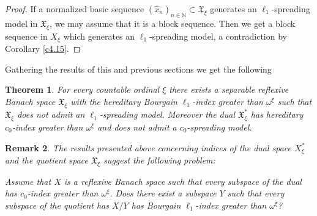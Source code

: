 \documentclass[a4paper]{amsart}
\theoremstyle{plain}
\newtheorem{theorem}{Theorem}[section]
\newtheorem{remark}[theorem]{Remark}
\newcommand{\N}{\mathbb{N}}
\newcommand{\hxn}[1][x]{(\widehat{#1}_{n})_{n\in\N}}
\begin{document}
\begin{proof}
If a normalized basic sequence $\hxn\subset \mathfrak{X}_{\xi}$ generates an $\ell_{1}$-spreading model  in
$\mathfrak{X}_{\xi}$, we may assume that it is a block sequence. Then we get a block
sequence in $X_{\xi}$ which generates an $\ell_{1}$-spreading model, a contradiction by
Corollary \ref{c4.15}.
\end{proof}
Gathering the results of this and previous sections  we get the following
\begin{theorem} For every countable  ordinal $\xi$ there exists a separable   reflexive Banach space $\mathfrak{X}_{\xi}$ with the hereditary Bourgain $\ell_{1}$-index greater than $\omega^{\xi}$ such that $\mathfrak{X}_{\xi}$ does not admit an $\ell_{1}$-spreading model. Moreover the dual  $\mathfrak{X}_{\xi}^{*}$ has  hereditary  $c_0$-index greater than $\omega^{\xi}$ and does not admit a $c_0$-spreading model.
\end{theorem}
\begin{remark}
The results presented above concerning indices of the dual space $X^*_\xi$ and the
quotient space $\mathfrak{X}_{\xi}$ suggest the following problem:

Assume that $X$ is a reflexive  Banach space such that every subspace of the dual has
 $c_0$-index greater than  $\omega^{\xi}$. Does there exist a subspace $Y$ such
that  every subspace of the quotient has  $X/Y$ has  Bourgain $\ell_{1}$-index greater than
$\omega^{\xi}$?
\end{remark}
\end{document}
